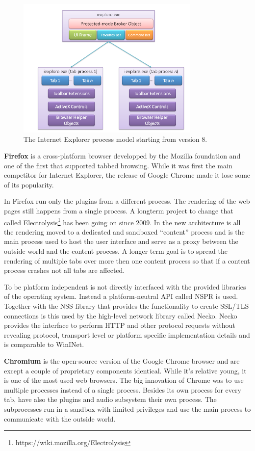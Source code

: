 \begin{figure}
    \centering
    \includegraphics[width=9cm]{Images/IE8_process_model.png}
    \caption{The Internet Explorer process model starting from version 8. \cite{zelfde msdn link}}
    \label{fig:ie8proc}
\end{figure}

\textbf{Firefox} is a cross-platform browser developped by the Mozilla foundation and one of the first that supported tabbed browsing. While it was first the main competitor for Internet Explorer, the release of Google Chrome made it lose some of its popularity.

In Firefox run only the plugins from a different process. The rendering of the web pages still happens from a single process. A longterm project to change that called Electrolysis\footnote{https://wiki.mozilla.org/Electrolysis} has been going on since 2009. In the new architecture is all the rendering moved to a dedicated and sandboxed ``content'' process and is the main process used to host the user interface and serve as a proxy between the outside world and the content process. A longer term goal is to spread the rendering of multiple tabs over more then one content process so that if a content process crashes not all tabs are affected.

To be platform independent is not directly interfaced with the provided libraries of the operating system. Instead a platform-neutral API called NSPR is used. Together with the NSS library that provides the functionality to create SSL/TLS connections is this used by the high-level network library called Necko. Necko provides the interface to perform HTTP and other protocol requests without revealing protocol, transport level or platform specific implementation details and is comparable to WinINet.

\textbf{Chromium} is the open-source version of the Google Chrome browser and are except a couple of proprietary components identical. While it's relative young, it is one of the most used web browsers. The big innovation of Chrome \cite{http://blog.chromium.org/2008/09/multi-process-architecture.html} was to use multiple processes instead of a single process. Besides its own process for every tab, have also the plugins and audio subsystem their own process. The subprocesses run in a sandbox with limited privileges and use the main process to communicate with the outside world.


